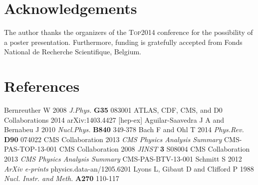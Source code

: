 \documentclass[a4paper]{jpconf}
\begin{document}
\section{Acknowledgements}
The author thanks the organizers of the \textsc{Top2014} conference for the possibility of a poster presentation. Furthermore, funding is gratefully accepted from Fonds National de Recherche Scientifique, Belgium.

\section*{References}
\begin{thebibliography}{9}
 Bernreuther W 2008 {\it J.Phys.} {\bf G35} 083001 
 ATLAS, CDF, CMS, and D0 Collaborations 2014 arXiv:1403.4427 [hep-ex]
 Aguilar-Saavedra J A and Bernabeu J 2010 {\it Nucl.Phys.} {\bf B840} 349-378 
 Bach F and Ohl T 2014 {\it Phys.Rev.} {\bf D90} 074022 
 CMS Collaboration 2013 {\it CMS Physics Analysis Summary} CMS-PAS-TOP-13-001
 CMS Collaboration 2008 {\it JINST} {\bf 3} S08004
 CMS Collaboration 2013 {\it CMS Physics Analysis Summary} CMS-PAS-BTV-13-001
 Schmitt S 2012 {\it ArXiv e-prints} physics.data-an/1205.6201
 Lyons L, Gibaut D and Clifford P 1988 {\it Nucl. Instr. and Meth.} {\bf A270} 110-117
\end{thebibliography}
\end{document}
